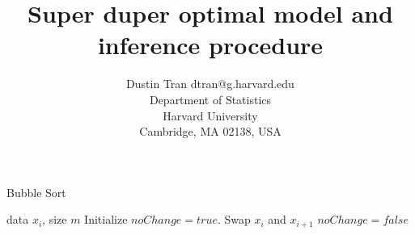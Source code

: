 \documentclass[twoside,11pt]{article}
\begin{document}
\title{Super duper optimal model and inference procedure}
\author{\name Dustin Tran \email dtran@g.harvard.edu\\
\addr Department of Statistics\\
Harvard University\\
Cambridge, MA 02138, USA
}

\editor{}

\maketitle
\begin{abstract}%
\end{abstract}

\begin{algorithm}[tb]
  \caption{Bubble Sort}
  \label{alg:example}
\begin{algorithmic}
   data $x_i$, size $m$
  \REPEAT
  \STATE Initialize $noChange = true$.
      \STATE Swap $x_i$ and $x_{i+1}$
      \STATE $noChange = false$
    \ENDIF
  \ENDFOR
\end{algorithmic}
\end{algorithm}
\fi

\nocite{*}

\end{document}
